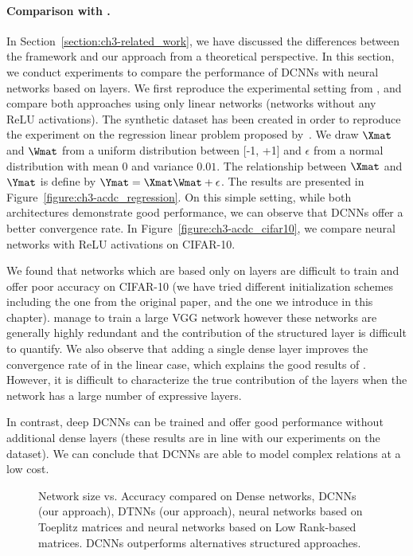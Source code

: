 \paragraph{Comparison with \ACDC \citep{moczulski2015acdc}.}

In Section~\ref{section:ch3-related_work}, we have discussed the differences between the \ACDC framework and our approach from a theoretical perspective.
In this section, we conduct experiments to compare the performance of DCNNs with neural networks based on \ACDC layers. 
We first reproduce the experimental setting from \citet{moczulski2015acdc}, and compare both approaches using only linear networks (\ie networks without any ReLU activations).
The synthetic dataset has been created in order to reproduce the experiment on the regression linear problem proposed by~\citet{moczulski2015acdc}.
We draw $\Xmat$ and $\Wmat$ from a uniform distribution between [-1, +1] and $\epsilon$ from a normal distribution with mean 0 and variance $0.01$.
The relationship between $\Xmat$ and $\Ymat$ is define by $\Ymat = \Xmat\Wmat + \epsilon$. 
The results are presented in Figure~\ref{figure:ch3-acdc_regression}.
On this simple setting, while both architectures demonstrate good performance, we can observe that DCNNs offer a better convergence rate.
In Figure~\ref{figure:ch3-acdc_cifar10}, we compare neural networks with ReLU activations on CIFAR-10. 

We found that networks which are based only on \ACDC layers are difficult to train and offer poor accuracy on CIFAR-10 (we have tried different initialization schemes including the one from the original paper, and the one we introduce in this chapter).
\citet{moczulski2015acdc} manage to train a large VGG network  however these networks are generally highly redundant and the contribution of the structured layer is difficult to quantify. 
We also observe that adding a single dense layer improves the convergence rate of \ACDC in the linear case, which explains the good results of \citet{moczulski2015acdc}.
However, it is difficult to characterize the true contribution of the \ACDC layers when the network has a large number of expressive layers.

In contrast, deep DCNNs can be trained and offer good performance without additional dense layers (these results are in line with our experiments on the \yt dataset).
We can conclude that DCNNs are able to model complex relations at a low cost. 

\begin{figure}
   \centering
   
   \caption{Network size vs. Accuracy compared on Dense networks, DCNNs (our approach), DTNNs (our approach), neural networks based on Toeplitz matrices and neural networks based on Low Rank-based matrices. DCNNs outperforms alternatives structured approaches.}
   \label{figure:ch3-cifar10_type}
\end{figure}

